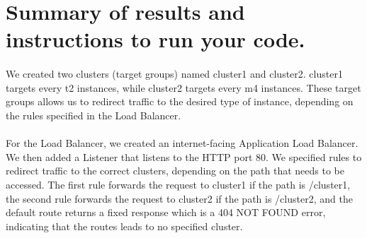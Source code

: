 \section{Summary of results and instructions to run your code.} \label{T7}

\paragraph{}We created two clusters (target groups) named cluster1 and cluster2. cluster1 targets every t2 instances, while cluster2 targets every m4 instances. These target groups allows us to redirect traffic to the desired type of instance, depending on the rules specified in the Load Balancer.
\paragraph{}For the Load Balancer, we created an internet-facing Application Load Balancer. We then added a Listener that listens to the HTTP port 80. We specified rules to redirect traffic to the correct clusters, depending on the path that needs to be accessed. The first rule forwards the request to cluster1 if the path is /cluster1, the second rule forwards the request to cluster2 if the path is /cluster2, and the default route returns a fixed response which is a 404 NOT FOUND error, indicating that the routes leads to no specified cluster.

